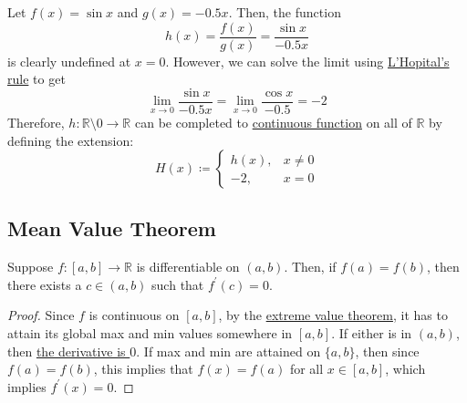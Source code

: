   \begin{example}
    \label{ex:a-function-with-infinitely-many-critical-points}
    Let $f(x) = \sin{x}$ and $g(x) = -0.5x$. Then, the function 
    \begin{equation}
      h(x) = \frac{f(x)}{g(x)} = \frac{\sin{x}}{-0.5x}
    \end{equation}
    is clearly undefined at $x = 0$. 
    However, we can solve the limit using \hyperref[thm:lhopital]{L'Hopital's rule} to get
    \begin{equation}
      \lim_{x \rightarrow 0} \frac{\sin{x}}{-0.5x} = \lim_{x \rightarrow 0} \frac{\cos{x}}{-0.5} = -2
    \end{equation}
    Therefore, $h: \mathbb{R} \setminus 0 \to \mathbb{R}$ can be completed to \hyperref[pst-def:continuous_func]{continuous function} on all of $\mathbb{R}$ by defining the extension: 
    \begin{equation}
      H(x) \coloneqq \begin{cases} h(x), & x \neq 0 \\ -2, & x = 0 \end{cases} 
    \end{equation}
  \end{example}

\subsection{Mean Value Theorem}

  \begin{theorem}
		\label{thm:rolle}
    Suppose $f: [a, b] \to \mathbb{R}$ is differentiable on $(a, b)$. Then, if $f(a) = f(b)$, then there exists a $c \in (a, b)$ such that $f^\prime (c) = 0$. 
  \end{theorem}
  \begin{proof}
		Since $f$ is continuous on $[a, b]$, by the \hyperref[pst-thm:evt]{extreme value theorem}, it has to attain its global max and min values somewhere in $[a, b]$. If either is in $(a, b)$, then \hyperref[thm:fermat_interior_extremum]{the derivative is $0$}. If max and min are attained on $\{a, b\}$, then since $f(a) = f(b)$, this implies that $f(x) = f(a)$ for all $x \in [a, b]$, which implies $f^\prime (x) = 0$. 
  \end{proof}

